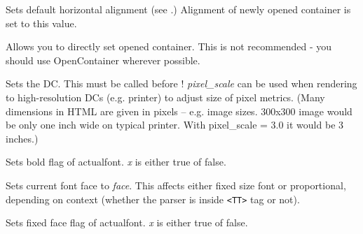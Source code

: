 \label{wxhtmlwinparsersetalign}


Sets default horizontal alignment (see 
.)
Alignment of newly opened container is set to this value.

\label{wxhtmlwinparsersetcontainer}


Allows you to directly set opened container. This is not recommended - you should use OpenContainer
wherever possible.

\label{wxhtmlwinparsersetdc}


Sets the DC. This must be called before !
{\it pixel\_scale}  can be used when rendering to high-resolution 
DCs (e.g. printer) to adjust size of pixel metrics. (Many dimensions in 
HTML are given in pixels -- e.g. image sizes. 300x300 image would be only one
inch wide on typical printer. With pixel\_scale = 3.0 it would be 3 inches.)

\label{wxhtmlwinparsersetfontbold}


Sets bold flag of actualfont. {\it x} is either true of false.

\label{wxhtmlwinparsersetfontface}


Sets current font face to {\it face}. This affects either fixed size
font or proportional, depending on context (whether the parser is 
inside {\tt <TT>} tag or not).

\label{wxhtmlwinparsersetfontfixed}


Sets fixed face flag of actualfont. {\it x} is either true of false.

\label{wxhtmlwinparsersetfontitalic}

